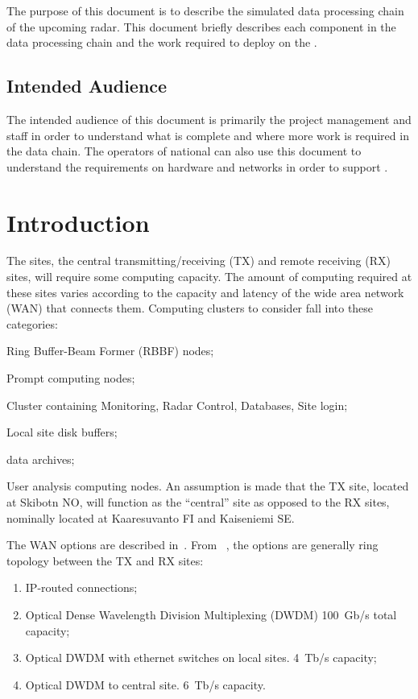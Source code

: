 \documentclass[12pt,a4paper]{article}
\begin{document}
The purpose of this document is to describe the simulated data processing chain of the upcoming \ED radar.
This document briefly describes each component in the data processing chain and the work required to deploy on the .

\subsection{Intended Audience}

The intended audience of this document is primarily the \ED project management and staff in order to understand what is complete and where more work is required in the data chain.
The operators of national  can also use this document to understand the requirements on hardware and networks in order to support \ED.

\section{Introduction}
\label{intro}

The \ED sites, the central transmitting/receiving (TX) and remote receiving (RX) sites, will require some computing capacity.
The amount of computing required at these sites varies according to the capacity and latency of the wide area network (WAN)
that connects them.
Computing clusters to consider fall into these categories:
\bitm
\item Ring Buffer-Beam Former (RBBF) nodes;
\item Prompt computing nodes;
\item Cluster containing Monitoring, Radar Control, Databases, Site login;
\item Local site disk buffers;
\item \ED data archives;
\item User analysis computing nodes.
  \eitm
An assumption is made that the TX site, located at Skibotn NO, will function as the ``central'' site as opposed to the RX sites, nominally located at Kaaresuvanto FI and Kaiseniemi SE.
  
The WAN options are described in~\cite{wan-options}.
From ~\cite{wan-options}, the options are generally ring topology between the TX and RX sites:
\begin{enumerate}
\item IP-routed connections;
\item Optical Dense Wavelength Division Multiplexing (DWDM) 100~Gb/s total capacity;
\item Optical DWDM with ethernet switches on local sites. 4~Tb/s capacity;
\item Optical DWDM to central site. 6~Tb/s capacity.
\end{enumerate}
\end{document}
